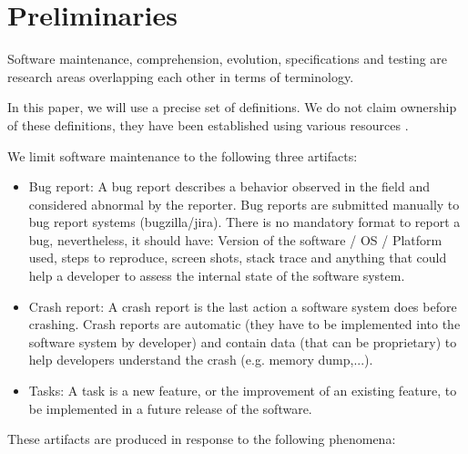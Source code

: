 
\section{Preliminaries\label{sec:preliminaries}}

Software maintenance, comprehension, evolution, specifications and testing are research areas overlapping each other in terms of terminology.

In this paper, we will use a precise set of definitions.
We do not claim ownership of these definitions, they have been established using various resources \cite{Avizienis2004,Pratt2001,Burnstein2006,Radatz1990,Whittaker2012}.

We limit software maintenance to the following three artifacts:

\begin{itemize}
	\item Bug report: A bug report describes a behavior observed in the field and considered abnormal by the reporter. Bug reports are submitted manually to bug report systems (bugzilla/jira). There is no mandatory format to report a bug, nevertheless, it should have: Version of the software / OS / Platform used, steps to reproduce, screen shots, stack trace and anything that could help a developer to assess the internal state of the software system.
	\item Crash report: A crash report is the last action a software system does before crashing. Crash reports are automatic (they have to be implemented into the software system by developer) and contain data (that can be proprietary) to help developers understand the crash (e.g. memory dump,...).
	\item Tasks: A task is a new feature, or the improvement of an existing feature, to be implemented in a future release of the software.
\end{itemize}

These artifacts are produced in response to the following phenomena:

